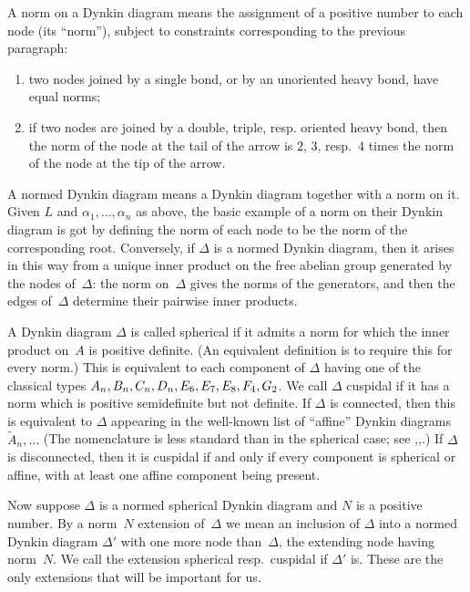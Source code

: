 \documentclass[12pt]{amsart}
\def\Atilde{\widetilde{A}}
\def\D{\Delta}
\numberwithin{theorem}{section}
\numberwithin{equation}{section}
\numberwithin{figure}{section}
\theoremstyle{remark}
\begin{document}
A norm on a Dynkin diagram means  the assignment
of a positive number  to each node (its ``norm''),
subject to constraints corresponding to the previous paragraph:
\begin{enumerate}
    \item
        two nodes joined by a single bond, or by an unoriented
        heavy bond, have equal norms;
    \item
        if two nodes are joined by a double, triple, resp.
        oriented heavy
        bond, then the norm of the
        node at the tail of the arrow is $2$, $3$, resp.\ $4$ times
        the norm of the node at the
        tip of the arrow.
\end{enumerate}
A normed Dynkin diagram means a Dynkin diagram together with 
a norm on it.
Given $L$ and $\alpha_1,\dots,\alpha_n$ as above, the basic example of
a norm on their Dynkin diagram is got by defining the
norm of each node to be the norm of the corresponding root.
Conversely, if $\D$ is a normed Dynkin diagram, then it arises
in this way from a unique  inner product on the free abelian group generated by
the nodes of~$\D$: the norm on~$\D$ gives the norms of the
generators, and then the edges of~$\D$ determine their
pairwise inner products.

A Dynkin diagram $\D$ is called spherical if it admits a norm for
which the inner product on~$A$ is positive definite.  (An equivalent
definition is to require this for every norm.)
This is equivalent to  each component
of $\D$ having one of the classical types 
$A_n,\discretionary{}{}{}B_n,\discretionary{}{}{}C_n,\discretionary{}{}{}D_n,\discretionary{}{}{}E_6,\discretionary{}{}{}E_7,\discretionary{}{}{}E_8,\discretionary{}{}{}F_4,\discretionary{}{}{}G_2$.
We call $\D$
cuspidal if it has a norm which is positive semidefinite
but not definite.  
If $\D$ is connected, then this is equivalent to $\D$ appearing
in the well-known list of ``affine'' Dynkin diagrams $\Atilde_n,\dots$
(The nomenclature is less standard than in the spherical case; see
\cite{AllcockAffine},\cite{Kac},\cite{MoodyPianzola}.)  
If $\D$ is disconnected, then it is cuspidal  if and only if every component is
spherical or affine, with at least one affine component being
present.

Now suppose $\D$ is a normed spherical Dynkin diagram 
and $N$ is a positive number.  By a norm~$N$ extension of~$\D$
we mean an inclusion of $\D$ into a normed Dynkin diagram
$\D'$ with one more node than~$\D$, the extending node having norm~$N$.
We call the extension spherical resp.\ cuspidal if
$\D'$ is.
These are the only extensions that will be important for us.  
\end{document}
